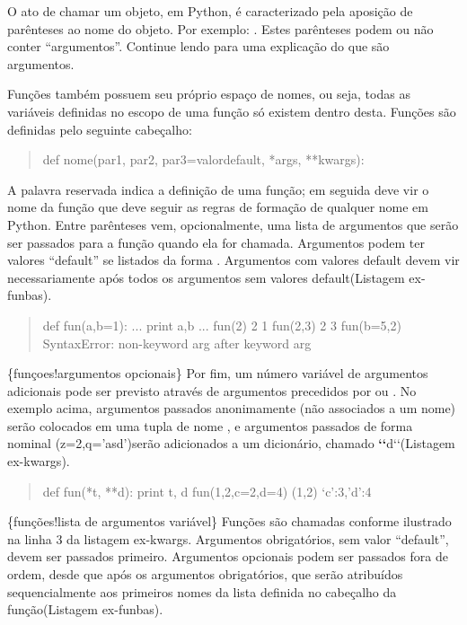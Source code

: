 \documentclass[a4paper,10pt,brazil]{sphinxmanual}
\begin{document}
O ato de chamar um objeto, em Python, é caracterizado pela aposição
de parênteses ao nome do objeto. Por exemplo: . Estes
parênteses podem ou não conter ``argumentos''. Continue lendo para
uma explicação do que são argumentos.

Funções também possuem seu próprio espaço de nomes, ou seja, todas
as variáveis definidas no escopo de uma função só existem dentro
desta. Funções são definidas pelo seguinte cabeçalho:
\begin{quote}

def nome(par1, par2, par3=valordefault, *args, **kwargs):
\end{quote}

A palavra reservada  indica a definição de uma função; em
seguida deve vir o nome da função que deve seguir as regras de
formação de qualquer nome em Python. Entre parênteses vem,
opcionalmente, uma lista de argumentos que serão ser passados para
a função quando ela for chamada. Argumentos podem ter valores
``default'' se listados da forma . Argumentos com valores
default devem vir necessariamente após todos os argumentos sem
valores default(Listagem ex-funbas).
\begin{quote}

def fun(a,b=1): ... print a,b ... fun(2) 2 1 fun(2,3) 2 3
fun(b=5,2) SyntaxError: non-keyword arg after keyword arg
\end{quote}

\{funçoes!argumentos opcionais\} Por fim, um número variável de
argumentos adicionais pode ser previsto através de argumentos
precedidos por \code{*} ou \code{**}. No exemplo acima, argumentos
passados anonimamente (não associados a um nome) serão colocados em
uma tupla de nome , e argumentos passados de forma nominal
(z=2,q='asd')serão adicionados a um dicionário, chamado
{\color{red}\bfseries{}{}`{}`}d{}`{}`(Listagem ex-kwargs).
\begin{quote}

def fun(*t, **d): print t, d fun(1,2,c=2,d=4) (1,2)
`c':3,'d':4
\end{quote}

\{funções!lista de argumentos variável\} Funções são chamadas
conforme ilustrado na linha 3 da listagem ex-kwargs. Argumentos
obrigatórios, sem valor ``default'', devem ser passados primeiro.
Argumentos opcionais podem ser passados fora de ordem, desde que
após os argumentos obrigatórios, que serão atribuídos
sequencialmente aos primeiros nomes da lista definida no cabeçalho
da função(Listagem ex-funbas).
\end{document}
